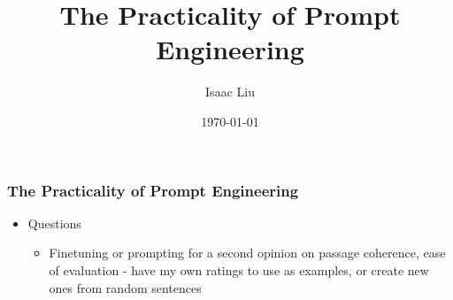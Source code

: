 \documentclass{beamer}
\title[The Practicality of Prompt Engineering]{The Practicality of Prompt Engineering}
\author{Isaac Liu}
\date{\today}
\begin{document}
    \begin{frame}
        \frametitle{The Practicality of Prompt Engineering}
        \begin{itemize}
            \item Questions
            \begin{itemize}
                \item Finetuning or prompting for a second opinion on passage coherence, ease of evaluation - have my own ratings to use as examples, or create new ones from random sentences
            \end{itemize}
        \end{itemize}
    \end{frame}


    
    


\end{document}
